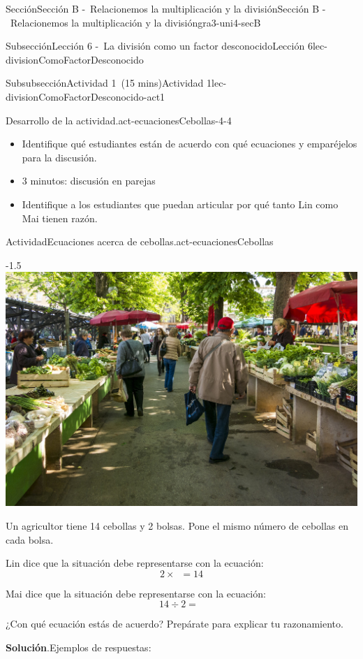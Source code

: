 \documentclass[oneside,10pt,]{article}
\newcommand{\blocktitlefont}{\relax}
\begin{document}
\begin{sectionptx}{Sección}{Sección B -~Relacionemos la multiplicación y la división}{}{Sección B -~Relacionemos la multiplicación y la división}{}{}{gra3-uni4-secB}
\begin{subsectionptx}{Subsección}{Lección 6 -~La división como un factor desconocido}{}{Lección 6}{}{}{lec-divisionComoFactorDesconocido}
\begin{subsubsectionptx}{Subsubsección}{Actividad 1~(15 mins)}{}{Actividad 1}{}{}{lec-divisionComoFactorDesconocido-act1}
\begin{paragraphs}{Desarrollo de la actividad.}{act-ecuacionesCebollas-4-4}
\begin{itemize}[label=\textbullet]
\item{}Identifique qué estudiantes están de acuerdo con qué ecuaciones y emparéjelos para la discusión.%
\item{}3 minutos: discusión en parejas%
\item{}Identifique a los estudiantes que puedan articular por qué tanto Lin como Mai tienen razón.%
\end{itemize}
\end{paragraphs}%
\begin{activity}{Actividad}{Ecuaciones acerca de cebollas.}{act-ecuacionesCebollas}%
\begin{image}{0.15}{0.7}{0.15}{-1.5\baselineskip}%
\includegraphics[width=\linewidth]{external/jpg-source/3.4.B6 Act 1 Launch.jpg}
\end{image}%
Un agricultor tiene 14 cebollas y 2 bolsas. Pone el mismo número de cebollas en cada bolsa.%
\par
Lin dice que la situación debe representarse con la ecuación:%
\begin{equation*}
2 \times \boxed{\phantom{3}} = 14
\end{equation*}
%
\par
Mai dice que la situación debe representarse con la ecuación:%
\begin{equation*}
14 \div 2 = \boxed{\phantom{3}}
\end{equation*}
%
\par
¿Con qué ecuación estás de acuerdo? Prepárate para explicar tu razonamiento.%
\par\smallskip%
\noindent\textbf{\blocktitlefont Solución}.\hypertarget{act-ecuacionesCebollas-3}{}\quad{}Ejemplos de respuestas:%
%
\begin{itemize}[label=\textbullet]

\end{itemize}
\end{activity}
\end{subsubsectionptx}
\end{subsectionptx}
\end{sectionptx}
\end{document}
